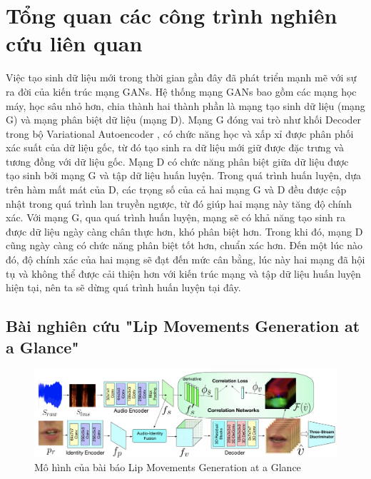\section{\texorpdfstring{Tổng quan các công trình nghiên cứu liên quan}{Content}}
Việc tạo sinh dữ liệu mới trong thời gian gần đây đã phát triển mạnh mẽ với sự ra đời của kiến trúc mạng GANs. Hệ thống mạng GANs bao gồm các mạng học máy, học sâu nhỏ hơn, chia thành hai thành phần là mạng tạo sinh dữ liệu (mạng G) và mạng phân biệt dữ liệu (mạng D). Mạng G đóng vai trò như khối Decoder trong bộ Variational Autoencoder \cite{vae_base},  có chức năng học và xấp xỉ được phân phối xác suất của dữ liệu gốc, từ đó tạo sinh ra dữ liệu mới giữ được đặc trưng và tương đồng với dữ liệu gốc. Mạng D có chức năng phân biệt giữa dữ liệu được tạo sinh bởi mạng G và tập dữ liệu huấn luyện. Trong quá trình huấn luyện, dựa trên hàm mất mát của D, các trọng số của cả hai mạng G và D đều được cập nhật trong quá trình lan truyền ngược, từ đó giúp hai mạng này tăng độ chính xác. Với mạng G, qua quá trình huấn luyện, mạng sẽ có khả năng tạo sinh ra được dữ liệu ngày càng chân thực hơn, khó phân biệt hơn. Trong khi đó, mạng D cũng ngày càng có chức năng phân biệt tốt hơn, chuẩn xác hơn. Đến một lúc nào đó, độ chính xác của hai mạng sẽ đạt đến mức cân bằng, lúc này hai mạng đã hội tụ và không thể được cải thiện hơn với kiến trúc mạng và tập dữ liệu huấn luyện hiện tại, nên ta sẽ dừng quá trình huấn luyện tại đây.


\subsection{\texorpdfstring{Bài nghiên cứu "Lip Movements Generation at a Glance"\cite{chen2018}}{Target}}

\begin{figure}[H]
    \centering
    \includegraphics[width=15cm]{./content/images/chen2018_model.png}
    \caption{Mô hình của bài báo Lip Movements Generation at a Glance}
    \label{fig:chen2018_model}
\end{figure}


